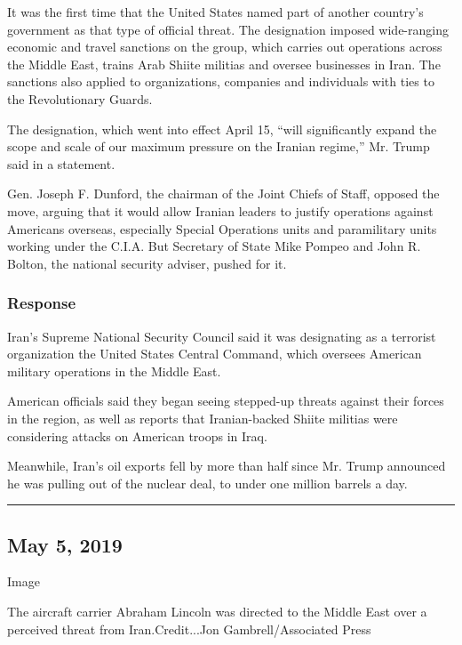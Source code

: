 It was the first time that the United States named part of another
country's government as that type of official threat. The designation
imposed wide-ranging economic and travel sanctions on the group, which
carries out operations across the Middle East, trains Arab Shiite
militias and oversee businesses in Iran. The sanctions also applied to
organizations, companies and individuals with ties to the Revolutionary
Guards.

The designation, which went into effect April 15, ``will significantly
expand the scope and scale of our maximum pressure on the Iranian
regime,'' Mr. Trump said in a statement.

Gen. Joseph F. Dunford, the chairman of the Joint Chiefs of Staff,
opposed the move, arguing that it would allow Iranian leaders to justify
operations against Americans overseas, especially Special Operations
units and paramilitary units working under the C.I.A. But Secretary of
State Mike Pompeo and John R. Bolton, the national security adviser,
pushed for it.

\hypertarget{response-1}{%
\subsubsection{\texorpdfstring{\textbf{Response}}{Response}}\label{response-1}}

Iran's Supreme National Security Council said it was designating as a
terrorist organization the United States Central Command, which oversees
American military operations in the Middle East.

American officials said they began seeing stepped-up threats against
their forces in the region, as well as reports that Iranian-backed
Shiite militias were considering attacks on American troops in Iraq.

Meanwhile, Iran's oil exports fell by more than half since Mr. Trump
announced he was pulling out of the nuclear deal, to under one million
barrels a day.

\begin{center}\rule{0.5\linewidth}{\linethickness}\end{center}

\hypertarget{may-5-2019}{%
\subsection{May 5, 2019}\label{may-5-2019}}

Image

The aircraft carrier Abraham Lincoln was directed to the Middle East
over a perceived threat from Iran.Credit...Jon Gambrell/Associated Press

